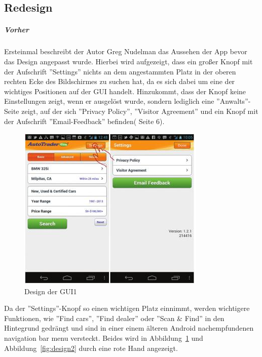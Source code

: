 \subsection{Redesign}
\label{sub:actionbars}

\subparagraph{Vorher}
\label{subp:vorher}
Ersteinmal beschreibt der Autor Greg Nudelman das Aussehen der App bevor das Design angepasst wurde. Hierbei wird aufgezeigt, dass ein großer Knopf mit der Aufschrift ''Settings'' nichts an dem angestammten Platz in der oberen rechten Ecke des Bildschirmes zu suchen hat, da es sich dabei um eine der wichtiges Positionen auf der GUI handelt. Hinzukommt, dass der Knopf keine Einstellungen zeigt, wenn er ausgelöst wurde, sondern lediglich eine ''Anwalts''-Seite zeigt, auf der sich ''Privacy Policy'', ''Visitor Agreement'' und ein Knopf mit der Aufschrift ''Email-Feedback'' befinden(\cite{AndroidDesignPatterns} Seite 6).\\

\begin{figure}[!h]
 \centering
 \includegraphics[height=0.40\textheight]{img/Design1.png}
 \caption{Design der GUI1}
 \label{fig:design1}
\end{figure}

Da der ''Settings''-Knopf so einen wichtigen Platz einnimmt, werden wichtigere Funktionen, wie ''Find cars'', ''Find dealer'' oder ''Scan \& Find'' in den Hintegrund gedrängt und sind in einer einem älteren Android nachempfundenen navigation bar menu versteckt. Beides wird in Abbildung~\ref{fig:design1} und Abbildung~\ref{fig:design2} durch eine rote Hand angezeigt.

